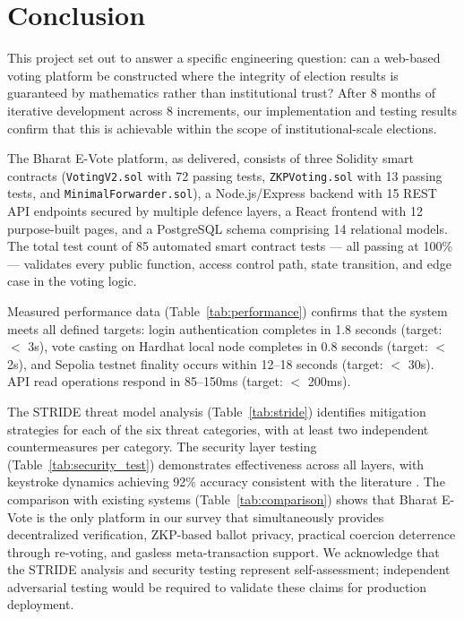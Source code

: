 \documentclass[oneside,a4paper,12pt]{book}
\begin{document}
\section{Conclusion}
This project set out to answer a specific engineering question: can a web-based voting platform be constructed where the integrity of election results is guaranteed by mathematics rather than institutional trust? After 8 months of iterative development across 8 increments, our implementation and testing results confirm that this is achievable within the scope of institutional-scale elections.

The Bharat E-Vote platform, as delivered, consists of three Solidity smart contracts (\texttt{VotingV2.sol} with 72 passing tests, \texttt{ZKPVoting.sol} with 13 passing tests, and \texttt{MinimalForwarder.sol}), a Node.js/Express backend with 15 REST API endpoints secured by multiple defence layers, a React frontend with 12 purpose-built pages, and a PostgreSQL schema comprising 14 relational models. The total test count of 85 automated smart contract tests --- all passing at 100\% --- validates every public function, access control path, state transition, and edge case in the voting logic.

Measured performance data (Table~\ref{tab:performance}) confirms that the system meets all defined targets: login authentication completes in 1.8 seconds (target: $<$ 3s), vote casting on Hardhat local node completes in 0.8 seconds (target: $<$ 2s), and Sepolia testnet finality occurs within 12--18 seconds (target: $<$ 30s). API read operations respond in 85--150ms (target: $<$ 200ms).

The STRIDE threat model analysis (Table~\ref{tab:stride}) identifies mitigation strategies for each of the six threat categories, with at least two independent countermeasures per category. The security layer testing (Table~\ref{tab:security_test}) demonstrates effectiveness across all layers, with keystroke dynamics achieving 92\% accuracy consistent with the literature \cite{ayotte2023}. The comparison with existing systems (Table~\ref{tab:comparison}) shows that Bharat E-Vote is the only platform in our survey that simultaneously provides decentralized verification, ZKP-based ballot privacy, practical coercion deterrence through re-voting, and gasless meta-transaction support. We acknowledge that the STRIDE analysis and security testing represent self-assessment; independent adversarial testing would be required to validate these claims for production deployment.
\end{document}
